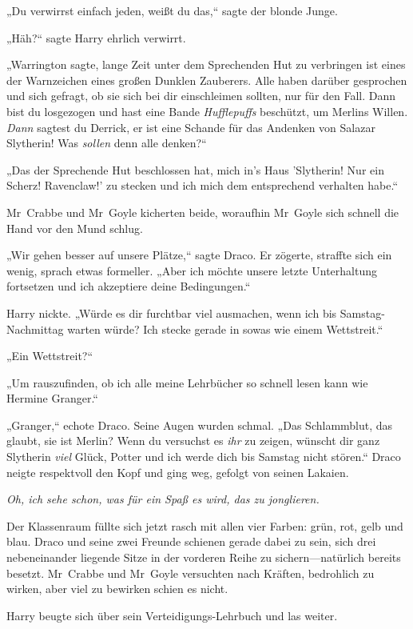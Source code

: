 {„Du verwirrst einfach jeden, weißt du das,“ sagte der blonde Junge.

„Häh?“ sagte Harry ehrlich verwirrt.

„Warrington sagte, lange Zeit unter dem Sprechenden Hut zu verbringen ist eines der Warnzeichen eines großen Dunklen Zauberers. Alle haben darüber gesprochen und sich gefragt, ob sie sich bei dir einschleimen sollten, nur für den Fall. Dann bist du losgezogen und hast eine Bande \emph{Hufflepuffs} beschützt, um Merlins Willen. \emph{Dann} sagtest du Derrick, er ist eine Schande für das Andenken von Salazar Slytherin! Was \emph{sollen} denn alle denken?“

„Das der Sprechende Hut beschlossen hat, mich in's Haus 'Slytherin! Nur ein Scherz! Ravenclaw!' zu stecken und ich mich dem entsprechend verhalten habe.“

Mr~Crabbe und Mr~Goyle kicherten beide, woraufhin Mr~Goyle sich schnell die Hand vor den Mund schlug.

„Wir gehen besser auf unsere Plätze,“ sagte Draco. Er zögerte, straffte sich ein wenig, sprach etwas formeller. „Aber ich möchte unsere letzte Unterhaltung fortsetzen und ich akzeptiere deine Bedingungen.“

Harry nickte. „Würde es dir furchtbar viel ausmachen, wenn ich bis Samstag-Nachmittag warten würde? Ich stecke gerade in sowas wie einem Wettstreit.“

„Ein Wettstreit?“

„Um rauszufinden, ob ich alle meine Lehrbücher so schnell lesen kann wie Hermine Granger.“

„Granger,“ echote Draco. Seine Augen wurden schmal. „Das Schlammblut, das glaubt, sie ist Merlin? Wenn du versuchst es \emph{ihr} zu zeigen, wünscht dir ganz Slytherin \emph{viel} Glück, Potter und ich werde dich bis Samstag nicht stören.“ Draco neigte respektvoll den Kopf und ging weg, gefolgt von seinen Lakaien.

\emph{Oh, ich sehe schon, was für ein Spaß es wird, das zu jonglieren.}

Der Klassenraum füllte sich jetzt rasch mit allen vier Farben: grün, rot, gelb und blau. Draco und seine zwei Freunde schienen gerade dabei zu sein, sich drei nebeneinander liegende Sitze in der vorderen Reihe zu sichern—natürlich bereits besetzt. Mr~Crabbe und Mr~Goyle versuchten nach Kräften, bedrohlich zu wirken, aber viel zu bewirken schien es nicht.

Harry beugte sich über sein Verteidigungs-Lehrbuch und las weiter.

}
